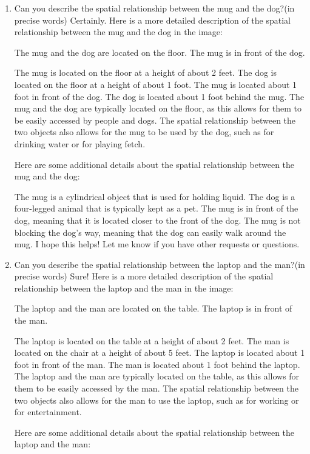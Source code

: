 \begin{enumerate}
    \item Can you describe the spatial relationship between the mug and the dog?(in precise words)
    \subitem Certainly. Here is a more detailed description of the spatial relationship between the mug and the dog in the image:

    The mug and the dog are located on the floor. The mug is in front of the dog.
    
    The mug is located on the floor at a height of about 2 feet.
    The dog is located on the floor at a height of about 1 foot.
    The mug is located about 1 foot in front of the dog.
    The dog is located about 1 foot behind the mug.
    The mug and the dog are typically located on the floor, as this allows for them to be easily accessed by people and dogs. The spatial relationship between the two objects also allows for the mug to be used by the dog, such as for drinking water or for playing fetch.
    
    Here are some additional details about the spatial relationship between the mug and the dog:
    
    The mug is a cylindrical object that is used for holding liquid.
    The dog is a four-legged animal that is typically kept as a pet.
    The mug is in front of the dog, meaning that it is located closer to the front of the dog.
    The mug is not blocking the dog's way, meaning that the dog can easily walk around the mug.
    I hope this helps! Let me know if you have other requests or questions.
    \item Can you describe the spatial relationship between the laptop and the man?(in precise words)
    \subitem Sure! Here is a more detailed description of the spatial relationship between the laptop and the man in the image:

    The laptop and the man are located on the table. The laptop is in front of the man.
    
    The laptop is located on the table at a height of about 2 feet.
    The man is located on the chair at a height of about 5 feet.
    The laptop is located about 1 foot in front of the man.
    The man is located about 1 foot behind the laptop.
    The laptop and the man are typically located on the table, as this allows for them to be easily accessed by the man. The spatial relationship between the two objects also allows for the man to use the laptop, such as for working or for entertainment.
    
    Here are some additional details about the spatial relationship between the laptop and the man:
    

\end{enumerate}
